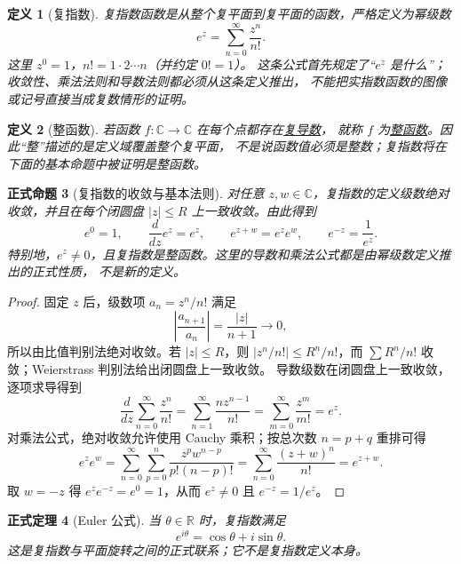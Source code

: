 \documentclass[UTF8,fontset=none,a4paper,11pt]{ctexart}
\theoremstyle{foundation-definition}
\newtheorem{definition}{定义}[section]
\theoremstyle{foundation-theorem}
\newtheorem{theorem}[definition]{正式定理}
\theoremstyle{foundation-proposition}
\newtheorem{proposition}[definition]{正式命题}
\theoremstyle{foundation-example}
\theoremstyle{foundation-remark}
\theoremstyle{foundation-theorem}
\newcommand{\term}[2]{\hyperref[#1]{#2}}
\begin{document}
\begin{definition}[复指数]\label{def:complex-exponential}
复指数函数是从整个复平面到复平面的函数，严格定义为幂级数
\[
e^z=\sum_{n=0}^{\infty}\frac{z^n}{n!}.
\]
这里 \(z^0=1\)，\(n!=1\cdot2\cdots n\)（并约定 \(0!=1\)）。
这条公式首先规定了“\(e^z\) 是什么”；收敛性、乘法法则和导数法则都必须从这条定义推出，
不能把实指数函数的图像或记号直接当成复数情形的证明。
\end{definition}

\begin{definition}[整函数]\label{def:entire-function}
若函数 \(f:\mathbb C\to\mathbb C\) 在每个点都存在\term{def:complex-derivative}{复导数}，
就称 \(f\) 为\term{def:entire-function}{整函数}。因此“整”描述的是定义域覆盖整个复平面，
不是说函数值必须是整数；复指数将在下面的基本命题中被证明是整函数。
\end{definition}

\begin{proposition}[复指数的收敛与基本法则]\label{prop:complex-exponential-basic}
对任意 \(z,w\in\mathbb C\)，复指数的定义级数绝对收敛，并且在每个闭圆盘
\(\lvert z\rvert\le R\) 上一致收敛。由此得到
\[
e^0=1,
\qquad
\frac{d}{dz}e^z=e^z,
\qquad
e^{z+w}=e^ze^w,
\qquad
e^{-z}=\frac1{e^z}.
\]
特别地，\(e^z\ne0\)，且复指数是整函数。这里的导数和乘法公式都是由幂级数定义推出的正式性质，
不是新的定义。
\end{proposition}

\begin{proof}
固定 \(z\) 后，级数项 \(a_n=z^n/n!\) 满足
\[
\left|\frac{a_{n+1}}{a_n}\right|=\frac{|z|}{n+1}\longrightarrow0,
\]
所以由比值判别法绝对收敛。若 \(|z|\le R\)，则
\(|z^n/n!|\le R^n/n!\)，而 \(\sum R^n/n!\) 收敛；Weierstrass 判别法给出闭圆盘上一致收敛。
导数级数在闭圆盘上一致收敛，逐项求导得到
\[
\frac{d}{dz}\sum_{n=0}^{\infty}\frac{z^n}{n!}
=\sum_{n=1}^{\infty}\frac{nz^{n-1}}{n!}
=\sum_{m=0}^{\infty}\frac{z^m}{m!}=e^z.
\]
对乘法公式，绝对收敛允许使用 Cauchy 乘积；按总次数 \(n=p+q\) 重排可得
\[
e^ze^w
=\sum_{n=0}^{\infty}\sum_{p=0}^{n}
\frac{z^pw^{n-p}}{p!(n-p)!}
=\sum_{n=0}^{\infty}\frac{(z+w)^n}{n!}
=e^{z+w}.
\]
取 \(w=-z\) 得 \(e^ze^{-z}=e^0=1\)，从而 \(e^z\ne0\) 且
\(e^{-z}=1/e^z\)。
\end{proof}

\begin{theorem}[Euler 公式]\label{thm:euler-formula}
当 \(\theta\in\mathbb R\) 时，复指数满足
\[
e^{i\theta}=\cos\theta+i\sin\theta.
\]
这是复指数与平面旋转之间的正式联系；它不是复指数定义本身。
\end{theorem}
\end{document}
